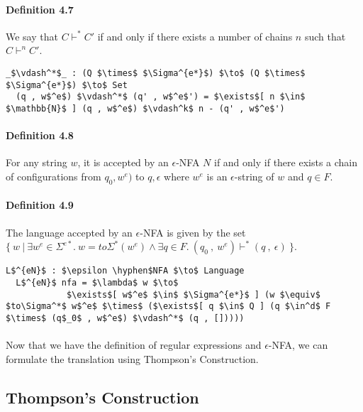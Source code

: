 \paragraph{Definition 4.7} We say that \(C \vdash^* C'\) if and only
if there exists a number of chains \(n\) such that \(C \vdash^n C'\). 

\begin{lstlisting}[mathescape=true]
  _$\vdash^*$_ : (Q $\times$ $\Sigma^{e*}$) $\to$ (Q $\times$ $\Sigma^{e*}$) $\to$ Set
  (q , w$^e$) $\vdash^*$ (q' , w$^e$') = $\exists$[ n $\in$ $\mathbb{N}$ ] (q , w$^e$) $\vdash^k$ n - (q' , w$^e$')
\end{lstlisting}

\paragraph{Definition 4.8} For any string \(w\), it is accepted by an \(\epsilon\)-NFA \(N\)
if and only if there exists a chain of configurations from \(q_0 ,
w^e)\) to \(q , \epsilon\) where \(w^e\) is an \(\epsilon\)-string of \(w\) and \(q \in
F\). 

\paragraph{Definition 4.9} The language accepted by an
\(\epsilon\)-NFA is given by the set \(\{\ w\ |\ \exists w^e\in
\Sigma^{e*}.\ w = to\Sigma^*(w^e) \wedge \exists q\in F.\ (q_0\ ,\
w^e) \vdash^* (q\ ,\ \epsilon)\ \}\). 

\begin{lstlisting}[mathescape=true]
  L$^{eN}$ : $\epsilon \hyphen$NFA $\to$ Language
  L$^{eN}$ nfa = $\lambda$ w $\to$ 
            $\exists$[ w$^e$ $\in$ $\Sigma^{e*}$ ] (w $\equiv$ $to\Sigma^*$ w$^e$ $\times$ ($\exists$[ q $\in$ Q ] (q $\in^d$ F $\times$ (q$_0$ , w$^e$) $\vdash^*$ (q , []))))
\end{lstlisting} 
\paragraph{} Now that we have the definition of regular expressions and
\(\epsilon\)-NFA, we can formulate the translation using Thompson's Construction.

\subsection{Thompson's Construction}

